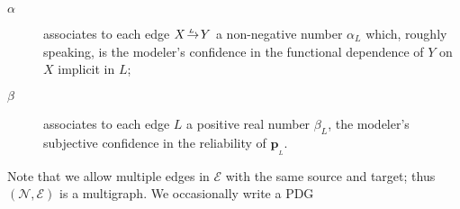 \documentclass[letterpaper]{article} %
\theoremstyle{plain}
\theoremstyle{definition}
\theoremstyle{remark}
\newcommand{\notation}[1]{{\color{notationcolor} #1}}
\renewcommand{\notation}[1]{\ignorespaces} %
\newcommand\mat[1]{\mathbf{#1}}
\newcommand{\bp}[1][L]{\mat{p}_{\!_{#1}\!}}
\newcommand{\V}{\mathcal V}
\newcommand{\N}{\mathcal N}
\newcommand{\Ed}{\mathcal E}
\newcommand{\dg}[1]{\mathbdcal{#1}}
\newcommand{\Gr}{\mathcal G}
\newcommand{\ed}[3]{#2\!%
  \overset{\smash{\mskip-5mu\raisebox{-1pt}{$\scriptscriptstyle
        #1$}}}{\rightarrow}\! #3}
\begin{document}
\begin{defn}
\begin{description}
\item[$\alpha$] \notation{$:\Ed \to [0,1]$}
%
%
associates to each edge $\ed LXY$ a non-negative number $\alpha_L$ which,
roughly speaking, is the modeler's confidence in the functional
dependence of $Y$ on $X$ implicit in $L$; 
\item[$\beta$] \notation{$:\Ed \to \mathbb R^+$}
associates to each edge $L$ a positive real number $\beta_L$,
the modeler's 
subjective confidence in the reliability of
$\bp$. 
\end{description}
Note that we allow multiple edges in $\Ed$ with the same source and
target; thus $(\N,\Ed)$ is a multigraph.  We occasionally write a PDG

\end{defn}
\end{document}
